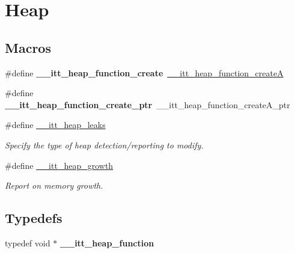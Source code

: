 \hypertarget{group__heap}{}\section{Heap}
\label{group__heap}
\subsection*{Macros}
\begin{DoxyCompactItemize}
\item 
\hypertarget{group__heap_gaee7be7751f527b329c003ab6b448c3b3}{}\#define {\bfseries \+\_\+\+\_\+itt\+\_\+heap\+\_\+function\+\_\+create}~\hyperlink{group__heap_gabbde8e9d232ceaf48c90adad4c1ce233}{\+\_\+\+\_\+itt\+\_\+heap\+\_\+function\+\_\+create\+A}\label{group__heap_gaee7be7751f527b329c003ab6b448c3b3}

\item 
\hypertarget{group__heap_gaa1e210ca1b3c31b5ee21996a2d9ed5d7}{}\#define {\bfseries \+\_\+\+\_\+itt\+\_\+heap\+\_\+function\+\_\+create\+\_\+ptr}~\+\_\+\+\_\+itt\+\_\+heap\+\_\+function\+\_\+create\+A\+\_\+ptr\label{group__heap_gaa1e210ca1b3c31b5ee21996a2d9ed5d7}

\item 
\#define \hyperlink{group__heap_gaaa7b9ac40d4b4111561778090c52ec40}{\+\_\+\+\_\+itt\+\_\+heap\+\_\+leaks}
\begin{DoxyCompactList}\small\item\em Specify the type of heap detection/reporting to modify. \end{DoxyCompactList}\item 
\hypertarget{group__heap_ga2cc49fdf479eba77b24b8ab3d507c5cd}{}\#define \hyperlink{group__heap_ga2cc49fdf479eba77b24b8ab3d507c5cd}{\+\_\+\+\_\+itt\+\_\+heap\+\_\+growth}\label{group__heap_ga2cc49fdf479eba77b24b8ab3d507c5cd}

\begin{DoxyCompactList}\small\item\em Report on memory growth. \end{DoxyCompactList}\end{DoxyCompactItemize}
\subsection*{Typedefs}
\begin{DoxyCompactItemize}
\item 
\hypertarget{group__heap_ga3907115617c96d09c646554d1a386bdf}{}typedef void $\ast$ {\bfseries \+\_\+\+\_\+itt\+\_\+heap\+\_\+function}\label{group__heap_ga3907115617c96d09c646554d1a386bdf}

\end{DoxyCompactItemize}

